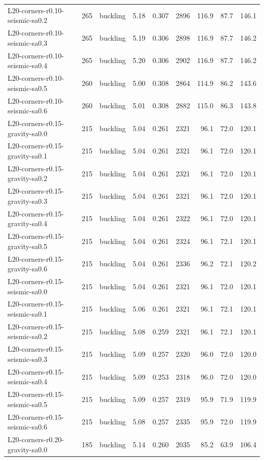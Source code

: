 \begin{longtable}{lrlrrrrrr}
L20-corners-r0.10-seismic-sa0.2 & 265 & buckling & 5.18 & 0.307 & 2896 & 116.9 & 87.7 & 146.1 \\
L20-corners-r0.10-seismic-sa0.3 & 265 & buckling & 5.19 & 0.306 & 2898 & 116.9 & 87.7 & 146.2 \\
L20-corners-r0.10-seismic-sa0.4 & 265 & buckling & 5.20 & 0.306 & 2902 & 116.9 & 87.7 & 146.2 \\
L20-corners-r0.10-seismic-sa0.5 & 260 & buckling & 5.00 & 0.308 & 2864 & 114.9 & 86.2 & 143.6 \\
L20-corners-r0.10-seismic-sa0.6 & 260 & buckling & 5.01 & 0.308 & 2882 & 115.0 & 86.3 & 143.8 \\
L20-corners-r0.15-gravity-sa0.0 & 215 & buckling & 5.04 & 0.261 & 2321 & 96.1 & 72.0 & 120.1 \\
L20-corners-r0.15-gravity-sa0.1 & 215 & buckling & 5.04 & 0.261 & 2321 & 96.1 & 72.0 & 120.1 \\
L20-corners-r0.15-gravity-sa0.2 & 215 & buckling & 5.04 & 0.261 & 2321 & 96.1 & 72.0 & 120.1 \\
L20-corners-r0.15-gravity-sa0.3 & 215 & buckling & 5.04 & 0.261 & 2321 & 96.1 & 72.0 & 120.1 \\
L20-corners-r0.15-gravity-sa0.4 & 215 & buckling & 5.04 & 0.261 & 2322 & 96.1 & 72.0 & 120.1 \\
L20-corners-r0.15-gravity-sa0.5 & 215 & buckling & 5.04 & 0.261 & 2324 & 96.1 & 72.1 & 120.1 \\
L20-corners-r0.15-gravity-sa0.6 & 215 & buckling & 5.04 & 0.261 & 2336 & 96.2 & 72.1 & 120.2 \\
L20-corners-r0.15-seismic-sa0.0 & 215 & buckling & 5.04 & 0.261 & 2321 & 96.1 & 72.0 & 120.1 \\
L20-corners-r0.15-seismic-sa0.1 & 215 & buckling & 5.06 & 0.261 & 2321 & 96.1 & 72.1 & 120.1 \\
L20-corners-r0.15-seismic-sa0.2 & 215 & buckling & 5.08 & 0.259 & 2321 & 96.1 & 72.1 & 120.1 \\
L20-corners-r0.15-seismic-sa0.3 & 215 & buckling & 5.09 & 0.257 & 2320 & 96.0 & 72.0 & 120.0 \\
L20-corners-r0.15-seismic-sa0.4 & 215 & buckling & 5.09 & 0.253 & 2318 & 96.0 & 72.0 & 120.0 \\
L20-corners-r0.15-seismic-sa0.5 & 215 & buckling & 5.09 & 0.257 & 2319 & 95.9 & 71.9 & 119.9 \\
L20-corners-r0.15-seismic-sa0.6 & 215 & buckling & 5.08 & 0.257 & 2335 & 95.9 & 72.0 & 119.9 \\
L20-corners-r0.20-gravity-sa0.0 & 185 & buckling & 5.14 & 0.260 & 2035 & 85.2 & 63.9 & 106.4 \\

\end{longtable}
